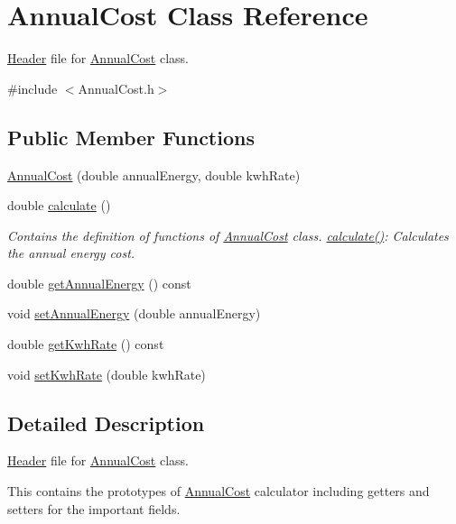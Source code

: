 \hypertarget{class_annual_cost}{}\section{Annual\+Cost Class Reference}
\label{class_annual_cost}


\hyperlink{class_header}{Header} file for \hyperlink{class_annual_cost}{Annual\+Cost} class.  




{\ttfamily \#include $<$Annual\+Cost.\+h$>$}

\subsection*{Public Member Functions}
\begin{DoxyCompactItemize}
\item 
\hyperlink{class_annual_cost_a723513a7074d1799e2bf410b60b3146f}{Annual\+Cost} (double annual\+Energy, double kwh\+Rate)
\item 
double \hyperlink{class_annual_cost_adb12b66af50d01746c3f6f0d430b1fdd}{calculate} ()
\begin{DoxyCompactList}\small\item\em Contains the definition of functions of \hyperlink{class_annual_cost}{Annual\+Cost} class. \hyperlink{class_annual_cost_adb12b66af50d01746c3f6f0d430b1fdd}{calculate()}\+: Calculates the annual energy cost. \end{DoxyCompactList}\item 
double \hyperlink{class_annual_cost_a0e217b7df05e6a03503e14d96570a192}{get\+Annual\+Energy} () const
\item 
void \hyperlink{class_annual_cost_a4379cc7b591abefb2302d74c57227357}{set\+Annual\+Energy} (double annual\+Energy)
\item 
double \hyperlink{class_annual_cost_ac01ed415360b6f52f61ec8a581333c29}{get\+Kwh\+Rate} () const
\item 
void \hyperlink{class_annual_cost_a45a1259c9912c7202dff446c290210e9}{set\+Kwh\+Rate} (double kwh\+Rate)
\end{DoxyCompactItemize}


\subsection{Detailed Description}
\hyperlink{class_header}{Header} file for \hyperlink{class_annual_cost}{Annual\+Cost} class. 

This contains the prototypes of \hyperlink{class_annual_cost}{Annual\+Cost} calculator including getters and setters for the important fields.


